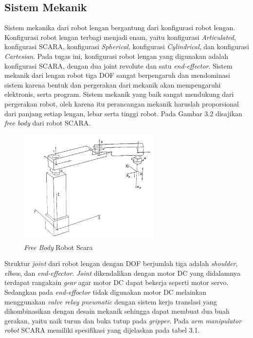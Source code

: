 \subsection{ Sistem Mekanik }
Sistem mekanika dari robot lengan bergantung dari konfigurasi robot lengan. Konfigurasi robot lengan terbagi menjadi enam, yaitu konfigurasi \textit{Articulated}, konfigurasi SCARA, konfigurasi \textit{Spherical}, konfigurasi \textit{Cylindrical}, dan konfigurasi \textit{Cartesian}. Pada tugas ini, konfigurasi robot lengan yang digunakan adalah konfigurasi SCARA, dengan dua joint revolute dan satu \textit{end-effector}. Sistem mekanik dari lengan robot tiga DOF sangat berpengaruh dan mendominasi sistem karena bentuk dan pergerakan dari mekanik akan mempengaruhi elektronis, serta program. Sistem mekanik yang baik sangat mendukung dari pergerakan robot, oleh karena itu perancangan mekanik haruslah proporsional dari panjang setiap lengan, lebar serta tinggi robot. Pada Gambar 3.2 disajikan \textit{free body} dari robot SCARA.
\begin{figure}[H]
	\centering
	\includegraphics[width=7cm]{gambar/scaraa.png}
	\caption{\textit{Free Body} Robot Scara}
\end{figure}
 Struktur \textit{joint} dari robot lengan dengan DOF berjumlah tiga adalah \textit{shoulder}, \textit{elbow}, dan \textit{end-effector}. \textit{Joint} dikendalikan dengan motor DC yang didalamnya terdapat rangakain \textit{gear} agar motor DC dapat bekerja seperti motor servo.  Sedangkan pada \textit{end-effoctor} tidak digunakan motor DC melainkan menggunakan \textit{valve relay pneumatic} dengan sistem kerja translasi yang dikombinasikan dengan desain mekanik sehingga dapat membuat dua buah gerakan, yaitu naik turun dan buka tutup pada \textit{gripper}. Pada \textit{arm manipulator robot} SCARA memiliki spesifikasi yang dijelaskan pada tabel 3.1.
 
